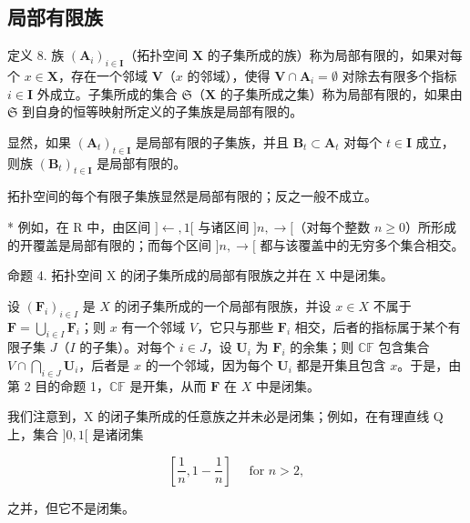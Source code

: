 \subsection{局部有限族}

定义 8. 族 \((\mathbf{A}_{i})_{i\in \mathbf{I}}\)（拓扑空间 \(\mathbf{X}\) 的子集所成的族）称为局部有限的，如果对每个 \(x\in \mathbf{X}\)，存在一个邻域 \(\mathbf{V}\)（\(x\) 的邻域），使得 \(\mathbf{V}\cap \mathbf{A}_i = \emptyset\) 对除去有限多个指标 \(i\in \mathbf{I}\) 外成立。子集所成的集合 \(\mathfrak{S}\)（\(\mathbf{X}\) 的子集所成之集）称为局部有限的，如果由 \(\mathfrak{S}\) 到自身的恒等映射所定义的子集族是局部有限的。

显然，如果 \((\mathbf{A}_t)_{t \in \mathbf{I}}\) 是局部有限的子集族，并且 \(\mathbf{B}_t \subset \mathbf{A}_t\) 对每个 \(t \in \mathbf{I}\) 成立，则族 \((\mathbf{B}_t)_{t \in \mathbf{I}}\) 是局部有限的。

拓扑空间的每个有限子集族显然是局部有限的；反之一般不成立。

* 例如，在 R 中，由区间 \(]\leftarrow, 1[\) 与诸区间 \(]n, \rightarrow[\)（对每个整数 \(n\geqslant0\)）所形成的开覆盖是局部有限的；而每个区间 \(]n, \rightarrow[\) 都与该覆盖中的无穷多个集合相交。

命题 4. 拓扑空间 X 的闭子集所成的局部有限族之并在 X 中是闭集。

设 \((\mathbf{F}_i)_{i\in I}\) 是 \(X\) 的闭子集所成的一个局部有限族，并设 \(x\in X\) 不属于 \(\mathbf{F} = \bigcup_{i\in I}\mathbf{F}_i\)；则 \(x\) 有一个邻域 \(V\)，它只与那些 \(\mathbf{F}_i\) 相交，后者的指标属于某个有限子集 \(J\)（\(I\) 的子集）。对每个 \(i\in J\)，设 \(\mathbf{U}_i\) 为 \(\mathbf{F}_i\) 的余集；则 \(\mathbb{CF}\) 包含集合 \(V\cap \bigcap_{i\in J}\mathbf{U}_i\)，后者是 \(x\) 的一个邻域，因为每个 \(\mathbf{U}_i\) 都是开集且包含 \(x\)。于是，由第 2 目的命题 1，\(\mathbb{CF}\) 是开集，从而 \(\mathbf{F}\) 在 \(X\) 中是闭集。

我们注意到，X 的闭子集所成的任意族之并未必是闭集；例如，在有理直线 Q 上，集合 \(]0, 1[\) 是诸闭集

\[
\left[ \frac {1}{n}, 1 - \frac {1}{n} \right] \quad \text { for } n > 2,
\]

之并，但它不是闭集。

